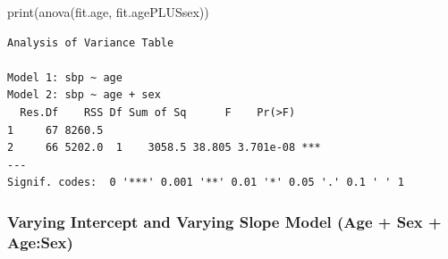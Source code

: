 \documentclass[
  letterpaper,
  DIV=11,
  numbers=noendperiod]{scrreprt}
\newenvironment{Shaded}{\begin{snugshade}}{\end{snugshade}}
\newcommand{\FunctionTok}[1]{\textcolor[rgb]{0.28,0.35,0.67}{#1}}
\newcommand{\NormalTok}[1]{\textcolor[rgb]{0.00,0.23,0.31}{#1}}
\begin{document}
\begin{Shaded}
\begin{Highlighting}[]
\FunctionTok{print}\NormalTok{(}\FunctionTok{anova}\NormalTok{(fit.age, fit.agePLUSsex))}
\end{Highlighting}
\end{Shaded}

\begin{verbatim}
Analysis of Variance Table

Model 1: sbp ~ age
Model 2: sbp ~ age + sex
  Res.Df    RSS Df Sum of Sq      F    Pr(>F)    
1     67 8260.5                                  
2     66 5202.0  1    3058.5 38.805 3.701e-08 ***
---
Signif. codes:  0 '***' 0.001 '**' 0.01 '*' 0.05 '.' 0.1 ' ' 1
\end{verbatim}

\subsubsection{Varying Intercept and Varying Slope Model (Age + Sex +
Age:Sex)}\label{varying-intercept-and-varying-slope-model-age-sex-agesex}
\end{document}
